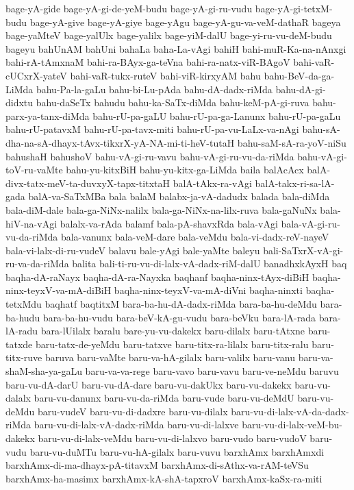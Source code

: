 {bage-yA-gide
bage-yA-gi-de-yeM-budu
bage-yA-gi-ru-vudu
bage-yA-gi-tetxM-budu
bage-yA-give
bage-yA-giye
bage-yAgu
bage-yA-gu-va-veM-dathaR
bageya
bage-yaMteV
bage-yalUlx
bage-yalilx
bage-yiM-dalU
bage-yi-ru-vu-deM-budu
bageyu
bahUnAM
bahUni
bahaLa
baha-La-vAgi
bahiH
bahi-muR-Ka-na-nAnxgi
bahi-rA-tAmxnaM
bahi-ra-BAyx-ga-teVna
bahi-ra-natx-viR-BAgoV
bahi-vaR-cUCxrX-yateV
bahi-vaR-tukx-ruteV
bahi-viR-kirxyAM
bahu
bahu-BeV-da-ga-LiMda
bahu-Pa-la-gaLu
bahu-bi-Lu-pAda
bahu-dA-dadx-riMda
bahu-dA-gi-didxtu
bahu-daSeTx
bahudu
bahu-ka-SaTx-diMda
bahu-keM-pA-gi-ruva
bahu-parx-ya-tanx-diMda
bahu-rU-pa-gaLU
bahu-rU-pa-ga-Lanunx
bahu-rU-pa-gaLu
bahu-rU-patavxM
bahu-rU-pa-tavx-miti
bahu-rU-pa-vu-LaLx-va-nAgi
bahu-sA-dha-na-sA-dhayx-tAvx-tikxrX-yA-NA-mi-ti-heV-tutaH
bahu-saM-sA-ra-yoV-niSu
bahushaH
bahushoV
bahu-vA-gi-ru-vavu
bahu-vA-gi-ru-vu-da-riMda
bahu-vA-gi-toV-ru-vaMte
bahu-yu-kitxBiH
bahu-yu-kitx-ga-LiMda
baila
balAcAcx
balA-divx-tatx-meV-ta-duvxyX-tapx-titxtaH
balA-tAkx-ra-vAgi
balA-takx-ri-sa-lA-gada
balA-va-SaTxMBa
bala
balaM
balabx-ja-vA-dadudx
balada
bala-diMda
bala-diM-dale
bala-ga-NiNx-nalilx
bala-ga-NiNx-na-lilx-ruva
bala-gaNuNx
bala-hiV-na-vAgi
balalx-va-rAda
balamf
bala-pA-shavxRda
bala-vAgi
bala-vA-gi-ru-vu-da-riMda
bala-vanunx
bala-veM-dare
bala-veMdu
bala-vi-dadx-reV-nayeV
bala-vi-lalx-di-ru-vudeV
balavu
bale-yAgi
bale-yaMte
baleyu
bali-SaTxrX-vA-gi-ru-va-da-riMda
balita
bali-ti-ru-vu-di-lalx-vA-dadx-riM-dalU
banadhxkAyxH
baq
baqha-dA-raNayx
baqha-dA-ra-Nayxka
baqhanf
baqha-ninx-tAyx-diBiH
baqha-ninx-teyxV-va-mA-diBiH
baqha-ninx-teyxV-va-mA-diVni
baqha-ninxti
baqha-tetxMdu
baqhatf
baqtitxM
bara-ba-hu-dA-dadx-riMda
bara-ba-hu-deMdu
bara-ba-hudu
bara-ba-hu-vudu
bara-beV-kA-gu-vudu
bara-beVku
bara-lA-rada
bara-lA-radu
bara-lUilalx
baralu
bare-yu-vu-dakekx
baru-dilalx
baru-tAtxne
baru-tatxde
baru-tatx-de-yeMdu
baru-tatxve
baru-titx-ra-lilalx
baru-titx-ralu
baru-titx-ruve
baruva
baru-vaMte
baru-va-hA-gilalx
baru-valilx
baru-vanu
baru-va-shaM-sha-ya-gaLu
baru-va-va-rege
baru-vavo
baru-vavu
baru-ve-neMdu
baruvu
baru-vu-dA-darU
baru-vu-dA-dare
baru-vu-dakUkx
baru-vu-dakekx
baru-vu-dalalx
baru-vu-danunx
baru-vu-da-riMda
baru-vude
baru-vu-deMdU
baru-vu-deMdu
baru-vudeV
baru-vu-di-dadxre
baru-vu-dilalx
baru-vu-di-lalx-vA-da-dadx-riMda
baru-vu-di-lalx-vA-dadx-riMda
baru-vu-di-lalxve
baru-vu-di-lalx-veM-bu-dakekx
baru-vu-di-lalx-veMdu
baru-vu-di-lalxvo
baru-vudo
baru-vudoV
baru-vudu
baru-vu-duMTu
baru-vu-hA-gilalx
baru-vuvu
barxhAmx
barxhAmxdi
barxhAmx-di-ma-dhayx-pA-titavxM
barxhAmx-di-sAthx-va-rAM-teVSu
barxhAmx-ha-masimx
barxhAmx-kA-shA-tapxroV
barxhAmx-kaSx-ra-miti
}
